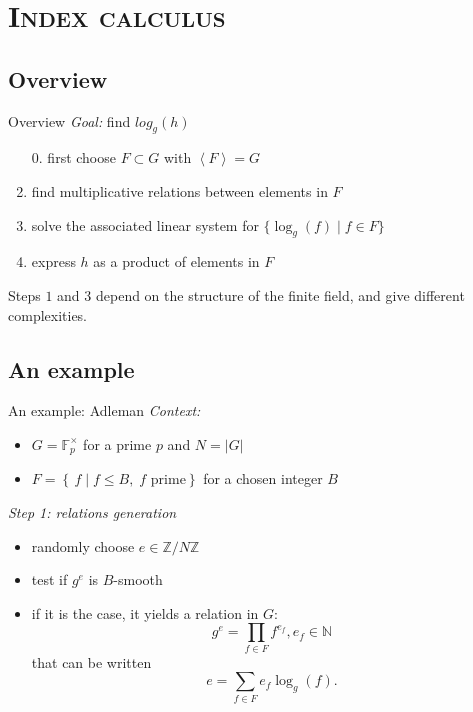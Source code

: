 \documentclass[xcolor=x11names,compress]{beamer}
\theoremstyle{break}
\theoremstyle{sc}
\theoremstyle{definition}
\theoremstyle{remark}
\begin{document}
\section{\scshape Index calculus}
\subsection{Overview}
\begin{frame}{Overview}
  \emph{Goal:} find $log_g(h)$ 
  \begin{enumerate}
    \item[0.] first choose $F\subset
  G$ with $\left\langle F \right\rangle = G$
    \item find multiplicative relations between elements in $F$
    \item solve the associated linear system for $\{ \log_g(f)\;|\;f\in F\}$
    \item express $h$ as a product of elements in $F$
  \end{enumerate}
  Steps $1$ and $3$ depend on the structure of the finite field, and
  give different complexities.
\end{frame}

\subsection{An example}
\begin{frame}{An example: Adleman}
  \emph{Context:}
  \begin{itemize}
    \item $G = \mathbb{F}_p^\times$ for a prime $p$ and $N = |G|$
    \item $F = \left\{\, f \;|\; f \leq B,\; f \text{ prime}
    \right\}$ for a chosen integer $B$
  \end{itemize}

  \emph{Step 1: relations generation}
  \begin{itemize}
    \item randomly choose $e\in \mathbb{Z}/N\mathbb{Z}$
    \item test if $g^e$ is $B$-smooth
    \item if it is the case, it yields a relation in $G$:
      \[ 
        g^e = \prod_{f\in F}f^{e_f}, e_f\in \mathbb{N}
      \]
      that can be written
      \[
        e = \sum_{f\in F}e_f\log_g(f).
      \]
  \end{itemize}
\end{frame}
\end{document}
